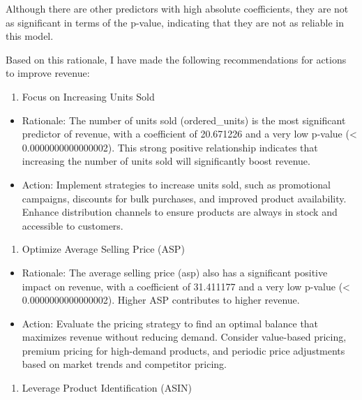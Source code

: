 \documentclass[
]{article}
\providecommand{\tightlist}{%
  \setlength{\itemsep}{0pt}\setlength{\parskip}{0pt}}
\begin{document}
Although there are other predictors with high absolute coefficients,
they are not as significant in terms of the p-value, indicating that
they are not as reliable in this model.

Based on this rationale, I have made the following recommendations for
actions to improve revenue:

\begin{enumerate}
\def\labelenumi{\arabic{enumi}.}
\tightlist
\item
  Focus on Increasing Units Sold
\end{enumerate}

\begin{itemize}
\item
  Rationale: The number of units sold (ordered\_units) is the most
  significant predictor of revenue, with a coefficient of 20.671226 and
  a very low p-value (\textless{} 0.0000000000000002). This strong
  positive relationship indicates that increasing the number of units
  sold will significantly boost revenue.
\item
  Action: Implement strategies to increase units sold, such as
  promotional campaigns, discounts for bulk purchases, and improved
  product availability. Enhance distribution channels to ensure products
  are always in stock and accessible to customers.
\end{itemize}

\begin{enumerate}
\def\labelenumi{\arabic{enumi}.}
\setcounter{enumi}{1}
\tightlist
\item
  Optimize Average Selling Price (ASP)
\end{enumerate}

\begin{itemize}
\item
  Rationale: The average selling price (asp) also has a significant
  positive impact on revenue, with a coefficient of 31.411177 and a very
  low p-value (\textless{} 0.0000000000000002). Higher ASP contributes
  to higher revenue.
\item
  Action: Evaluate the pricing strategy to find an optimal balance that
  maximizes revenue without reducing demand. Consider value-based
  pricing, premium pricing for high-demand products, and periodic price
  adjustments based on market trends and competitor pricing.
\end{itemize}

\begin{enumerate}
\def\labelenumi{\arabic{enumi}.}
\setcounter{enumi}{2}
\tightlist
\item
  Leverage Product Identification (ASIN)
\end{enumerate}
\end{document}
